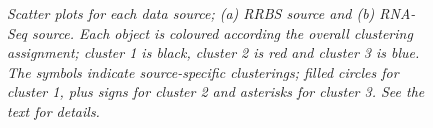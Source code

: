 \begin{figure}[ht!]
     \begin{center}
    \end{center}
    \caption{\emph{Scatter plots for each data source; (a) RRBS source and (b) RNA-Seq source.  Each object is coloured according the overall clustering assignment; cluster 1 is black, cluster 2 is red and cluster 3 is blue. The symbols indicate source-specific clusterings; filled circles for cluster 1, plus signs for cluster 2 and asterisks for cluster 3. See the text for details.}}
   \label{bcc2D-pic}
\end{figure}


